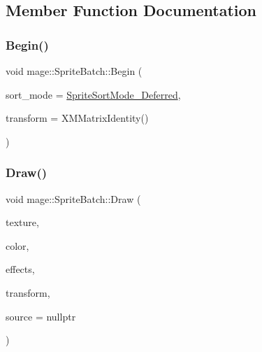 \subsection{Member Function Documentation}
\hypertarget{classmage_1_1_sprite_batch_ac87527519c5adc9df0420c372f208374}{}\label{classmage_1_1_sprite_batch_ac87527519c5adc9df0420c372f208374} 
\subsubsection{\texorpdfstring{Begin()}{Begin()}}
{\footnotesize\ttfamily void mage\+::\+Sprite\+Batch\+::\+Begin (\begin{DoxyParamCaption}\item[{\hyperlink{namespacemage_a256fa5833eecc408923de7ffadb5e014}{Sprite\+Sort\+Mode}}]{sort\+\_\+mode = {\ttfamily \hyperlink{namespacemage_a256fa5833eecc408923de7ffadb5e014a80d3415039a297067a179e981ef0dada}{Sprite\+Sort\+Mode\+\_\+\+Deferred}},  }\item[{X\+M\+M\+A\+T\+R\+IX}]{transform = {\ttfamily XMMatrixIdentity()} }\end{DoxyParamCaption})}

\hypertarget{classmage_1_1_sprite_batch_a9c10b2c38a57a46f82bff18d65ed47fa}{}\label{classmage_1_1_sprite_batch_a9c10b2c38a57a46f82bff18d65ed47fa} 
\subsubsection{\texorpdfstring{Draw()}{Draw()}}
{\footnotesize\ttfamily void mage\+::\+Sprite\+Batch\+::\+Draw (\begin{DoxyParamCaption}\item[{I\+D3\+D11\+Shader\+Resource\+View $\ast$}]{texture,  }\item[{const X\+M\+V\+E\+C\+T\+OR \&}]{color,  }\item[{\hyperlink{namespacemage_a9cfe18123066ba4236f548f9de75d881}{Sprite\+Effect}}]{effects,  }\item[{const \hyperlink{structmage_1_1_sprite_transform}{Sprite\+Transform} \&}]{transform,  }\item[{const R\+E\+CT $\ast$}]{source = {\ttfamily nullptr} }\end{DoxyParamCaption})}

